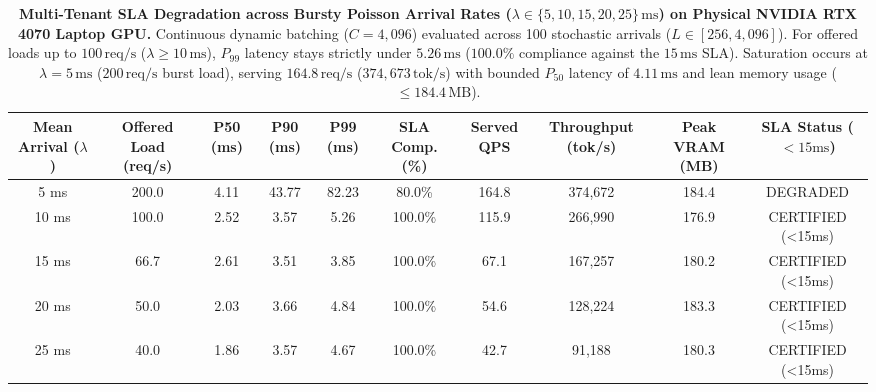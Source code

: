 \documentclass[journal]{IEEEtran}
\begin{document}
\begin{table}[t]
\centering
\small
\caption{\textbf{Multi-Tenant SLA Degradation across Bursty Poisson Arrival Rates ($\lambda \in \{5, 10, 15, 20, 25\}\,\text{ms}$) on Physical NVIDIA RTX 4070 Laptop GPU.} Continuous dynamic batching ($C=4{,}096$) evaluated across 100 stochastic arrivals ($L \in [256, 4{,}096]$). For offered loads up to $100\,\text{req/s}$ ($\lambda \ge 10\,\text{ms}$), $P_{99}$ latency stays strictly under $5.26\,\text{ms}$ ($100.0\%$ compliance against the $15\,\text{ms}$ SLA). Saturation occurs at $\lambda=5\,\text{ms}$ ($200\,\text{req/s}$ burst load), serving $164.8\,\text{req/s}$ ($374{,}673\,\text{tok/s}$) with bounded $P_{50}$ latency of $4.11\,\text{ms}$ and lean memory usage ($\le 184.4\,\text{MB}$).}
\label{tab:arrival_rate_sweep}
\begin{tabular}{cccccccccc}
\toprule
\textbf{Mean Arrival ($\lambda$)} & \textbf{Offered Load (req/s)} & \textbf{P50 (ms)} & \textbf{P90 (ms)} & \textbf{P99 (ms)} & \textbf{SLA Comp. (\%)} & \textbf{Served QPS} & \textbf{Throughput (tok/s)} & \textbf{Peak VRAM (MB)} & \textbf{SLA Status ($<15\text{ms}$)} \\
\midrule
5 ms              & 200.0                & 4.11 & 43.77 & 82.23 & 80.0\% & 164.8 & 374,672 & 184.4 & DEGRADED \\
10 ms             & 100.0                & 2.52 & 3.57 & 5.26 & 100.0\% & 115.9 & 266,990 & 176.9 & CERTIFIED (<15ms) \\
15 ms             & 66.7                 & 2.61 & 3.51 & 3.85 & 100.0\% & 67.1 & 167,257 & 180.2 & CERTIFIED (<15ms) \\
20 ms             & 50.0                 & 2.03 & 3.66 & 4.84 & 100.0\% & 54.6 & 128,224 & 183.3 & CERTIFIED (<15ms) \\
25 ms             & 40.0                 & 1.86 & 3.57 & 4.67 & 100.0\% & 42.7 & 91,188 & 180.3 & CERTIFIED (<15ms) \\
\bottomrule
\end{tabular}
\end{table}
\end{document}
